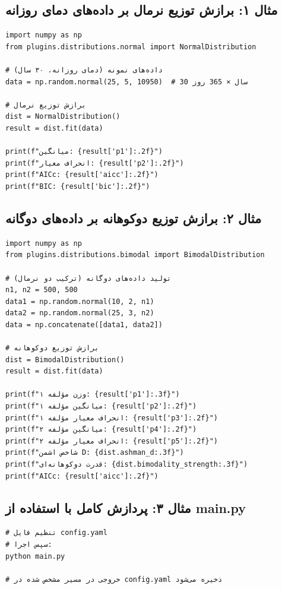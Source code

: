 \documentclass[a4paper,12pt]{article}
\begin{document}
\subsection{مثال ۱: برازش توزیع نرمال بر داده‌های دمای روزانه}

\begin{verbatim}
import numpy as np
from plugins.distributions.normal import NormalDistribution

# داده‌های نمونه (دمای روزانه، ۳۰ سال)
data = np.random.normal(25, 5, 10950)  # 30 سال × 365 روز

# برازش توزیع نرمال
dist = NormalDistribution()
result = dist.fit(data)

print(f"میانگین: {result['p1']:.2f}")
print(f"انحراف معیار: {result['p2']:.2f}")
print(f"AICc: {result['aicc']:.2f}")
print(f"BIC: {result['bic']:.2f}")
\end{verbatim}

\subsection{مثال ۲: برازش توزیع دوکوهانه بر داده‌های دوگانه}

\begin{verbatim}
import numpy as np
from plugins.distributions.bimodal import BimodalDistribution

# تولید داده‌های دوگانه (ترکیب دو نرمال)
n1, n2 = 500, 500
data1 = np.random.normal(10, 2, n1)
data2 = np.random.normal(25, 3, n2)
data = np.concatenate([data1, data2])

# برازش توزیع دوکوهانه
dist = BimodalDistribution()
result = dist.fit(data)

print(f"وزن مؤلفه ۱: {result['p1']:.3f}")
print(f"میانگین مؤلفه ۱: {result['p2']:.2f}")
print(f"انحراف معیار مؤلفه ۱: {result['p3']:.2f}")
print(f"میانگین مؤلفه ۲: {result['p4']:.2f}")
print(f"انحراف معیار مؤلفه ۲: {result['p5']:.2f}")
print(f"شاخص اشمن D: {dist.ashman_d:.3f}")
print(f"قدرت دوکوهانه‌ای: {dist.bimodality_strength:.3f}")
print(f"AICc: {result['aicc']:.2f}")
\end{verbatim}

\subsection{مثال ۳: پردازش کامل با استفاده از main.py}

\begin{verbatim}
# تنظیم فایل config.yaml
# سپس اجرا:
python main.py

# خروجی در مسیر مشخص شده در config.yaml ذخیره می‌شود
\end{verbatim}
\end{document}
